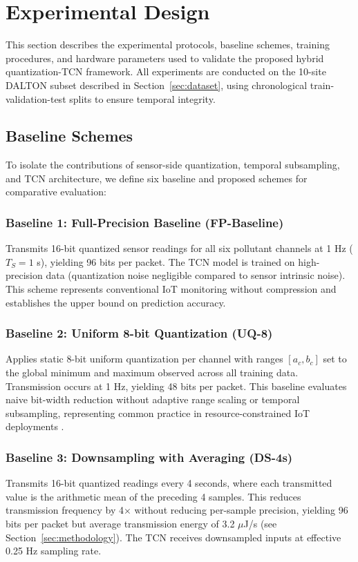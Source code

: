 \section{Experimental Design}
\label{sec:experiments}

This section describes the experimental protocols, baseline schemes, training procedures, and hardware parameters used to validate the proposed hybrid quantization-TCN framework. All experiments are conducted on the 10-site DALTON subset described in Section~\ref{sec:dataset}, using chronological train-validation-test splits to ensure temporal integrity.

\subsection{Baseline Schemes}

To isolate the contributions of sensor-side quantization, temporal subsampling, and TCN architecture, we define six baseline and proposed schemes for comparative evaluation:

\subsubsection{Baseline 1: Full-Precision Baseline (FP-Baseline)}
Transmits 16-bit quantized sensor readings for all six pollutant channels at 1 Hz ($T_S = 1$ s), yielding 96 bits per packet. The TCN model is trained on high-precision data (quantization noise negligible compared to sensor intrinsic noise). This scheme represents conventional IoT monitoring without compression and establishes the upper bound on prediction accuracy.

\subsubsection{Baseline 2: Uniform 8-bit Quantization (UQ-8)}
Applies static 8-bit uniform quantization per channel with ranges $[a_c, b_c]$ set to the global minimum and maximum observed across all training data. Transmission occurs at 1 Hz, yielding 48 bits per packet. This baseline evaluates naive bit-width reduction without adaptive range scaling or temporal subsampling, representing common practice in resource-constrained IoT deployments \cite{taştan2022lowcost}.

\subsubsection{Baseline 3: Downsampling with Averaging (DS-4s)}
Transmits 16-bit quantized readings every 4 seconds, where each transmitted value is the arithmetic mean of the preceding 4 samples. This reduces transmission frequency by 4$\times$ without reducing per-sample precision, yielding 96 bits per packet but average transmission energy of 3.2 $\mu$J/s (see Section~\ref{sec:methodology}). The TCN receives downsampled inputs at effective 0.25 Hz sampling rate.

